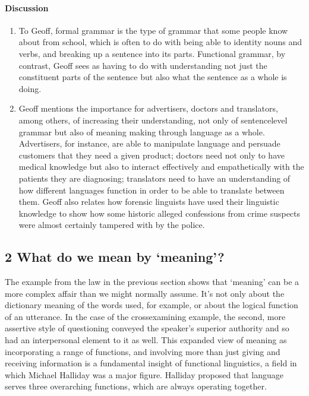 \documentclass[letterpaper,10pt,english]{sphinxmanual}
\begin{document}
\paragraph{Discussion}
\label{\detokenize{content/session_00/Part_00_01:id10}}\begin{enumerate}
%
\item {} 
To Geoff, formal grammar is the type of grammar that some people know about from school, which is often to do with being able to identity nouns and verbs, and breaking up a sentence into its parts. Functional grammar, by contrast, Geoff sees as having to do with understanding not just the constituent parts of the sentence but also what the sentence as a whole is doing.

\item {} 
Geoff mentions the importance for advertisers, doctors and translators, among others, of increasing their understanding, not only of sentence\sphinxhyphen{}level grammar but also of meaning making through language as a whole. Advertisers, for instance, are able to manipulate language and persuade customers that they need a given product; doctors need not only to have medical knowledge but also to interact effectively and empathetically with the patients they are diagnosing; translators need to have an
understanding of how different languages function in order to be able to translate between them. Geoff also relates how forensic linguists have used their linguistic knowledge to show how some historic alleged confessions from crime suspects were almost certainly tampered with by the police.

\end{enumerate}


\subsection{2 What do we mean by ‘meaning’?}
\label{\detokenize{content/session_00/Part_00_02:2-What-do-we-mean-by-_u2018meaning_u2019?}}\label{\detokenize{content/session_00/Part_00_02::doc}}
The example from the law in the previous section shows that ‘meaning’ can be a more complex affair than we might normally assume. It’s not only about the dictionary meaning of the words used, for example, or about the logical function of an utterance. In the case of the cross\sphinxhyphen{}examining example, the second, more assertive style of questioning conveyed the speaker’s superior authority and so had an interpersonal element to it as well. This expanded view of meaning \textendash{} as incorporating a range of
functions, and involving more than just giving and receiving information \textendash{} is a fundamental insight of functional linguistics, a field in which Michael Halliday was a major figure. Halliday proposed that language serves three overarching functions, which are always operating together.
\end{document}
